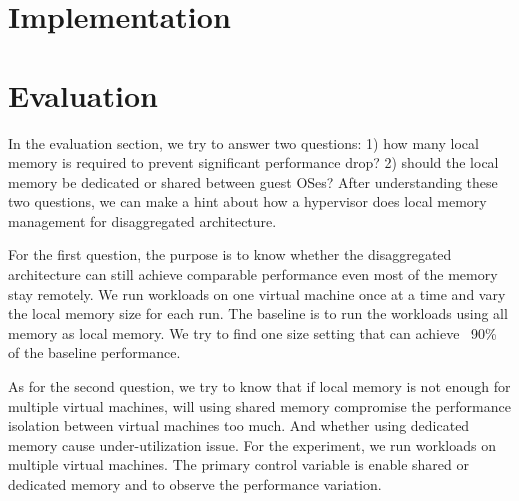 \documentclass[twocolumn]{article}
\begin{document}
\section{Implementation}

\section{Evaluation}
In the evaluation section, we try to answer two questions: 1) how many local memory is required to prevent significant performance drop? 2) should the local memory be dedicated or shared between guest OSes? After understanding these two questions, we can make a hint about how a hypervisor does local memory management for disaggregated architecture.

For the first question, the purpose is to know whether the disaggregated architecture can still achieve comparable performance even most of the memory stay remotely. We run workloads on one virtual machine once at a time and vary the local memory size for each run. The baseline is to run the workloads using all memory as local memory. We try to find one size setting that can achieve ~90\% of the baseline performance.

As for the second question, we try to know that if local memory is not enough for multiple virtual machines, will using shared memory compromise the performance isolation between virtual machines too much. And whether using dedicated memory cause under-utilization issue. For the experiment, we run workloads on multiple virtual machines. The primary control variable is enable shared or dedicated memory and to observe the performance variation.

{}

\end{document}
